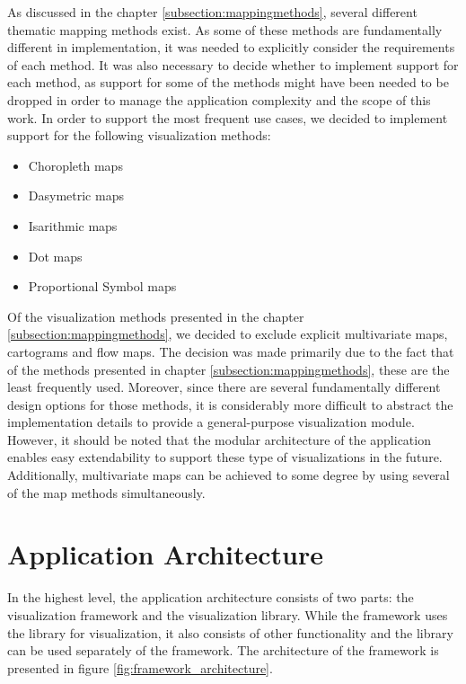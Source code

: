 As discussed in the chapter \ref{subsection:mappingmethods}, several different thematic mapping methods exist. As some of these methods are fundamentally different in implementation, it was needed to explicitly consider the requirements of each method. It was also necessary to decide whether to implement support for each method, as support for some of the methods might have been needed to be dropped in order to manage the application complexity and the scope of this work. In order to support the most frequent use cases, we decided to implement support for the following visualization methods:

\begin{itemize}
	\item Choropleth maps
	\item Dasymetric maps
	\item Isarithmic maps
	\item Dot maps
	\item Proportional Symbol maps
\end{itemize}

Of the visualization methods presented in the chapter \ref{subsection:mappingmethods}, we decided to exclude explicit multivariate maps, cartograms and flow maps. The decision was made primarily due to the fact that of the methods presented in chapter \ref{subsection:mappingmethods}, these are the least frequently used. Moreover, since there are several fundamentally different design options for those methods, it is considerably more difficult to abstract the implementation details to provide a general-purpose visualization module. However, it should be noted that the modular architecture of the application enables easy extendability to support these type of visualizations in the future. Additionally, multivariate maps can be achieved to some degree by using several of the map methods simultaneously.

\section{Application Architecture}

In the highest level, the application architecture consists of two parts: the visualization framework and the visualization library. While the framework uses the library for visualization, it also consists of other functionality and the library can be used separately of the framework. The architecture of the framework is presented in figure \ref{fig:framework_architecture}.

